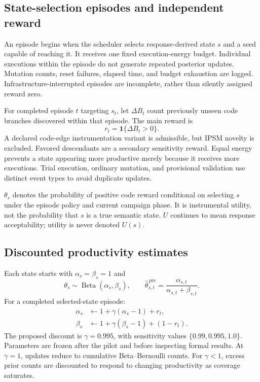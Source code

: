 \documentclass[final,5p,times,number]{elsarticle}
\begin{document}
\subsection{State-selection episodes and independent reward}
An episode begins when the scheduler selects response-derived state $s$ and a seed capable of reaching it. It receives one fixed execution-energy budget. Individual executions within the episode do not generate repeated posterior updates. Mutation counts, reset failures, elapsed time, and budget exhaustion are logged. Infrastructure-interrupted episodes are incomplete, rather than silently assigned reward zero.

For completed episode $t$ targeting $s_t$, let $\Delta B_t$ count previously unseen code branches discovered within that episode. The main reward is
\begin{equation}
r_t=\mathbf{1}\{\Delta B_t>0\}.
\label{eq:reward}
\end{equation}
A declared code-edge instrumentation variant is admissible, but IPSM novelty is excluded. Favored descendants are a secondary sensitivity reward. Equal energy prevents a state appearing more productive merely because it receives more executions. Trial execution, ordinary mutation, and provisional validation use distinct event types to avoid duplicate updates.

$\theta_s$ denotes the probability of positive code reward conditional on selecting $s$ under the episode policy and current campaign phase. It is instrumental utility, not the probability that $s$ is a true semantic state. $U$ continues to mean response acceptability; utility is never denoted $U(s)$.

\subsection{Discounted productivity estimates}
Each state starts with $\alpha_s=\beta_s=1$ and
\begin{equation}
\theta_s\sim\operatorname{Beta}(\alpha_s,\beta_s),\qquad
\widehat{\theta}_{s,t}^{\,\mathrm{pre}}
=\frac{\alpha_{s,t}}{\alpha_{s,t}+\beta_{s,t}}.
\end{equation}
For a completed selected-state episode:
\begin{align}
\alpha_s&\leftarrow1+\gamma(\alpha_s-1)+r_t,\\
\beta_s&\leftarrow1+\gamma(\beta_s-1)+(1-r_t).
\label{eq:update}
\end{align}
The proposed discount is $\gamma=0.995$, with sensitivity values $\{0.99,0.995,1.0\}$. Parameters are frozen after the pilot and before inspecting formal results. At $\gamma=1$, updates reduce to cumulative Beta--Bernoulli counts. For $\gamma<1$, excess prior counts are discounted to respond to changing productivity as coverage saturates.
\end{document}
